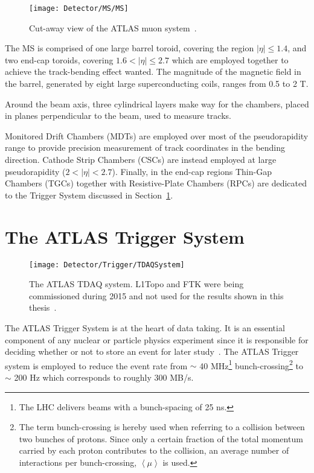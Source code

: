 			\begin{figure}[!htb]
				\centering
				\texttt{[image: Detector/MS/MS]}
				\caption{Cut-away view of the ATLAS muon system~\cite{ATLASJINST}.}
				\label{fig:MS}
			\end{figure}

			The MS is comprised of one large barrel toroid, covering the region $\left| \eta \right | \leq 1.4$, and two end-cap toroids, covering $1.6 < \left| \eta \right| \leq 2.7$ which are employed together to achieve the track-bending effect wanted. The magnitude of the magnetic field in the barrel, generated by eight large superconducting coils, ranges from 0.5 to 2 T. 

			Around the beam axis, three cylindrical layers make way for the chambers, placed in planes perpendicular to the beam, used to measure tracks. 

			Monitored Drift Chambers (MDTs) are employed over most of the pseudorapidity range to provide precision measurement of track coordinates in the bending direction. 
			Cathode Strip Chambers (CSCs) are instead employed at large pseudorapidity ($2 < \left | \eta \right | < 2.7$). 
			Finally, in the end-cap regions Thin-Gap Chambers (TGCs) together with Resistive-Plate Chambers (RPCs) are dedicated to the Trigger System discussed in Section~\ref{sec:trigSyst}. 


	\section{The ATLAS Trigger System}
	\label{sec:trigSyst}

		\begin{figure}[!htb]
			\centering
			\texttt{[image: Detector/Trigger/TDAQSystem]}
			\caption{The ATLAS TDAQ system. L1Topo and FTK were being commissioned during 2015 and not used for the results shown in this thesis~\cite{ATLASTrigger2015}.}
			\label{fig:TDAQSyst}
		\end{figure}

		The ATLAS Trigger System is at the heart of data taking. It is an essential component of any nuclear or particle physics experiment since it is responsible for deciding whether or not to store an event for later study~\cite{ATLASTrigger2015}. The ATLAS Trigger system is employed to reduce the event rate from $\sim$ 40 MHz\footnote{The LHC delivers beams with a bunch-spacing of 25 ns.} bunch-crossing\footnote{The term bunch-crossing is hereby used when referring to a collision between two bunches of protons. Since only a certain fraction of the total momentum carried by each proton contributes to the collision, an average number of interactions per bunch-crossing, $\left < \mu \right >$ is used.} to $\sim$ 200 Hz which corresponds to roughly 300 MB/s.

